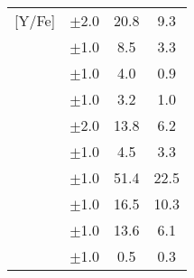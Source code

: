 \begin{table}
\begin{tabular}{cccc}
    [Y/Fe] & $\pm$2.0 & 20.8 & 9.3 \\
    [Zr/Fe] & $\pm$1.0 & 8.5 & 3.3 \\
    [Mo/Fe] & $\pm$1.0 & 4.0 & 0.9 \\
    [Ru/Fe] & $\pm$1.0 & 3.2 & 1.0 \\
    [Ba/Fe] & $\pm$2.0 & 13.8 & 6.2 \\
    [La/Fe] & $\pm$1.0 & 4.5 & 3.3 \\
    [Ce/Fe] & $\pm$1.0 & 51.4 & 22.5 \\
    [Nd/Fe] & $\pm$1.0 & 16.5 & 10.3 \\
    [Sm/Fe] & $\pm$1.0 & 13.6 & 6.1 \\
    [Eu/Fe] & $\pm$1.0 & 0.5 & 0.3 \\
    \hline
    \end{tabular}
\end{table}
